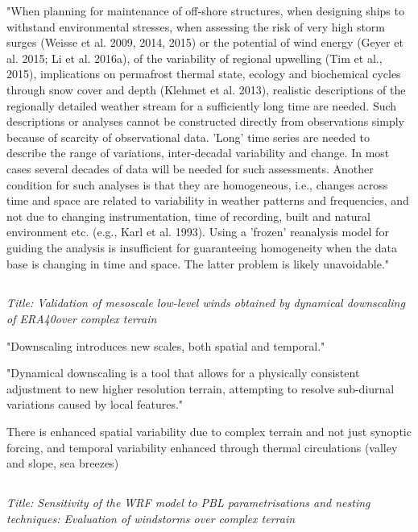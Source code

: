\documentclass[12pt,a4paper]{article}
\begin{document}
"When planning for maintenance of off‐shore structures, when designing ships to withstand environmental stresses, when assessing the risk of very high storm surges (Weisse et al. 2009, 2014, 2015) or the potential of wind energy (Geyer et al. 2015; Li et al. 2016a), of the variability of regional upwelling (Tim et al., 2015), implications on permafrost thermal state, ecology and biochemical cycles through snow cover and depth (Klehmet et al. 2013), realistic descriptions of the regionally detailed weather stream for a sufficiently long time are needed. Such descriptions or analyses cannot be constructed directly from observations simply because of scarcity of observational data. 'Long' time series are needed to describe the range of variations, inter-decadal variability and change. In most cases several decades of data will be needed for such assessments. Another condition for such analyses is that they are homogeneous, i.e., changes across time and space are related to variability in weather patterns and frequencies, and not due to changing instrumentation, time of recording, built and natural environment etc. (e.g., Karl et al. 1993). Using a 'frozen' reanalysis model for guiding the analysis is insufficient for guaranteeing homogeneity when the data base is changing in time and space. The latter problem is likely unavoidable."

\subsection{\cite{Zagar2006}}

\textit{Title: Validation of mesoscale low-level winds obtained by dynamical downscaling of ERA40over complex terrain}
 
"Downscaling introduces new scales, both spatial and temporal."

"Dynamical downscaling is a tool that allows for a physically consistent adjustment to new higher resolution terrain, attempting to resolve sub-diurnal variations caused by local features."

There is enhanced spatial variability due to complex terrain and not just synoptic forcing, and temporal variability enhanced through thermal circulations (valley and slope, sea breezes) 


\subsection{\cite{Gomez-Navarro2015}}

\textit{Title:  Sensitivity of the WRF model to PBL parametrisations and nesting techniques: Evaluation of windstorms over complex terrain}
\end{document}
